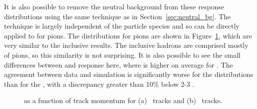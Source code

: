 It is also possible to remove the neutral background from these response distributions using the same technique as in Section~\ref{sec:neutral_bg}. 
The technique is largely independent of the particle species and so can be directly applied to \epav for pions. 
The \epcor distributions for pions are shown in Figure~\ref{fig:identified_epcor}, which are very similar to the inclusive results.
The inclusive hadrons are comprised mostly of pions, so this similarity is not surprising.
It is also possible to see the small differences between \pip and \pim response here, where \epcor is higher on average for \pip.
The agreement between data and simulation is significantly worse for the \pim distributions than for the \pip, with a discrepancy greater than 10\% below 2-3 \GeV. 

\begin{figure}[h]
\centering
{}
\caption{\epcor as a function of track momentum for (a) \pip\ tracks and (b) \pim\ tracks.}
\label{fig:identified_epcor}
\end{figure}

